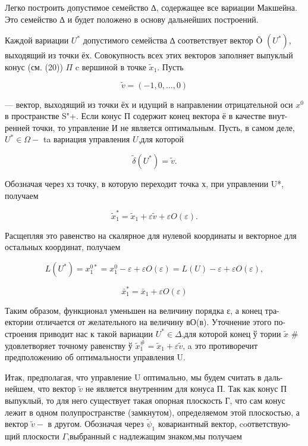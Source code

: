 \documentclass[10pt]{article}
\begin{document}
Легко построить допустимое семейство ∆, содержащее все вариации Макшейна. Это семейство ∆ и будет положено в основу дальнейших построений.

Каждой вариации \({U}^{ * }\) допустимого семейства ∆ соответствует вектор Õ \(\left( {U}^{ * }\right)\), выходящий из точки ёх. Совокупность всех этих векторов заполняет выпуклый конус (см. (20)) \(\Pi\) c вершиной в точке \({\widetilde{x}}_{1}\). Пусть

\[
\widetilde{v} = \left( {-1,0,\ldots,0}\right)
\]

— вектор, выходящий из точки ёх и идущий в направлении отрицательной оси \({x}^{0}\) в пространстве S"+. Если конус П содержит конец вектора ё в качестве внут- ренней точки, то управление И не является оптимальным. Пусть, в самом деле, \({U}^{ * } \in  \Omega  -\) ta вариация управления \(U\),для которой

\[
\widetilde{\delta }\left( {U}^{ * }\right)  = \widetilde{v}.
\]

Обозначая через хз точку, в которую переходит точка х, при управлении U*, получаем

\[
{\widetilde{x}}_{1}^{ * } = {\widetilde{x}}_{1} + \varepsilon \widetilde{v} + {\varepsilon O}\left( \varepsilon \right).
\]

Расщепляя это равенство на скалярное для нулевой координаты и векторное для остальных координат, получаем

\[
L\left( {U}^{ * }\right)  = {x}_{1}^{0 * } = {x}_{1}^{0} - \varepsilon  + {\varepsilon O}\left( \varepsilon \right)  = L\left( U\right)  - \varepsilon  + {\varepsilon O}\left( \varepsilon \right),
\]

\[
{\bar{x}}_{1}^{ * } = {\bar{x}}_{1} + {\varepsilon O}\left( \varepsilon \right)
\]

Таким образом, функционал уменьшен на величину порядка ε, а конец тра- ектории отличается от желательного на величину вО(в). Уточнение этого по- строения приводит нас к такой вариации \({U}^{ * } \in  \Delta\),для которой конец ў тории \(\widetilde{x}\) \# удовлетворяет точному равенству ў \({\widetilde{x}}_{1}^{\# } = {\widetilde{x}}_{1} + \varepsilon \widetilde{v}\), a это противоречит предположению об оптимальности управления U.

Итак, предполагая, что управление U оптимально, мы будем считать в даль- нейшем, что вектор \(\widetilde{v}\) не является внутренним для конуса П. Так как конус П выпуклый, то для него существует такая опорная плоскость Г, что сам конус лежит в одном полупространстве (замкнутом), определяемом этой плоскостью, а вектор \(\widetilde{v} -\) в другом. Обозначая через \({\widetilde{\psi }}_{1}\) ковариантный вектор, coответствую- щий плоскости \(\Gamma\),выбранный с надлежащим знаком,мы получаем
\end{document}
